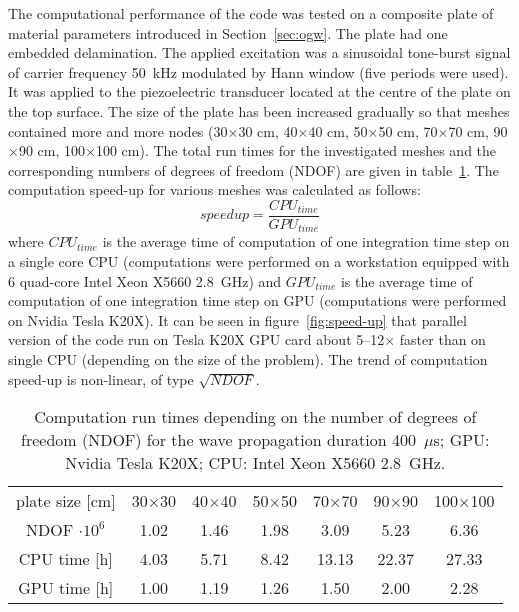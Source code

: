 \documentclass[12pt]{iopart}
\begin{document}
The computational performance of the code was tested on a composite plate of material parameters introduced in Section~\ref{sec:ogw}. The plate had one embedded delamination. The applied excitation was a sinusoidal tone-burst signal of carrier frequency 50~kHz modulated by Hann window (five periods were used). It was applied to the piezoelectric transducer located at the centre of the plate on the top surface. The size of the plate has been increased gradually so that meshes contained more and more nodes (30\(\times\)30 cm, 40\(\times\)40 cm, 50\(\times\)50 cm, 70\(\times\)70 cm, 90\(\times\)90 cm, 100\(\times\)100 cm). The total run times for the investigated meshes and the corresponding numbers of degrees of freedom (NDOF) are given in table~\ref{tab:run_time}. The computation speed-up for various meshes was calculated as follows:
\begin{equation}
speedup = \frac{CPU_{time}}{GPU_{time}}
\label{eq:speedup}
\end{equation}
where \(CPU_{time}\) is the average time of computation of one integration time step on a single core CPU (computations were performed on a workstation equipped with 6 quad-core Intel Xeon X5660 2.8~GHz) and \(GPU_{time}\) is the average time of computation of one integration time step on GPU (computations were performed on Nvidia Tesla K20X). It can be seen in figure~\ref{fig:speed-up} that parallel version of the code run on Tesla K20X GPU card about 5--12\(\times\) faster than on single CPU (depending on the size of the problem). The trend of computation speed-up is non-linear, of type \(\sqrt{NDOF}\). 

\begin{table}
		\caption{Computation run times depending on the number of degrees of freedom (NDOF) for the wave propagation duration 400~\(\mu\)s; GPU: Nvidia Tesla K20X; CPU: Intel Xeon X5660 2.8~GHz.}
	\begin{indented}
	\item[]	\begin{tabular}{ccccccc} 
		\toprule	
		plate size [cm] & 30\(\times\)30  & 40\(\times\)40 & 50\(\times\)50 & 70\(\times\)70 & 90\(\times\)90 & 100\(\times\)100 \\
		NDOF \(\cdot 10^6\) & 1.02  & 1.46 & 1.98 & 3.09 & 5.23 & 6.36 \\
		\midrule
		CPU time [h]& 4.03& 5.71 & 8.42 & 13.13 & 22.37 & 27.33\\
		\midrule
		GPU time [h]& 1.00& 1.19 & 1.26 & 1.50 & 2.00 & 2.28\\
		\bottomrule 
	\end{tabular} 
\end{indented}
	\label{tab:run_time}
\end{table}
\end{document}
